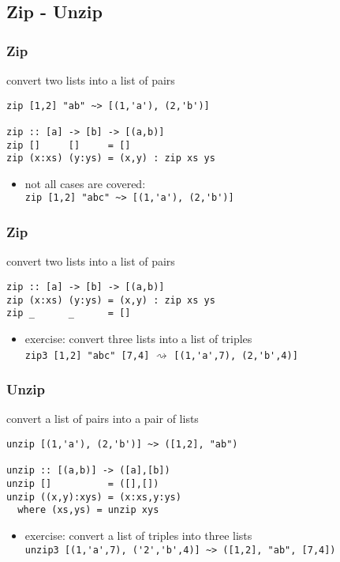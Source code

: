 \documentclass[dvipsnames]{beamer}
\theoremstyle{plain}
\begin{document}
\subsection{Zip - Unzip}

\begin{frame}[fragile]
  \frametitle{Zip}

  \begin{exampleblock}{convert two lists into a list of pairs}
    \begin{lstlisting}
zip [1,2] "ab" ~> [(1,'a'), (2,'b')]

zip :: [a] -> [b] -> [(a,b)]
zip []     []     = []
zip (x:xs) (y:ys) = (x,y) : zip xs ys
    \end{lstlisting}
  \end{exampleblock}

  \pause
  \begin{itemize}
    \item not all cases are covered:\\
      \lstinline{zip [1,2] "abc" ~> [(1,'a'), (2,'b')]}
  \end{itemize}
\end{frame}

\begin{frame}[fragile]
  \frametitle{Zip}

  \begin{exampleblock}{convert two lists into a list of pairs}
    \begin{lstlisting}
zip :: [a] -> [b] -> [(a,b)]
zip (x:xs) (y:ys) = (x,y) : zip xs ys
zip _      _      = []
    \end{lstlisting}
  \end{exampleblock}

  \pause
  \begin{itemize}
    \item exercise: convert three lists into a list of triples\\
      \lstinline{zip3 [1,2] "abc" [7,4]} $\rightsquigarrow$
      \lstinline{[(1,'a',7), (2,'b',4)]}
  \end{itemize}
\end{frame}

\begin{frame}[fragile]
  \frametitle{Unzip}

  \begin{exampleblock}{convert a list of pairs into a pair of lists}
    \begin{lstlisting}
unzip [(1,'a'), (2,'b')] ~> ([1,2], "ab")

unzip :: [(a,b)] -> ([a],[b])
unzip []          = ([],[])
unzip ((x,y):xys) = (x:xs,y:ys)
  where (xs,ys) = unzip xys
    \end{lstlisting}
  \end{exampleblock}

  \pause
  \begin{itemize}
    \item exercise: convert a list of triples into three lists\\
      \lstinline{unzip3 [(1,'a',7), ('2','b',4)] ~> ([1,2], "ab", [7,4])}
  \end{itemize}
\end{frame}
\end{document}
